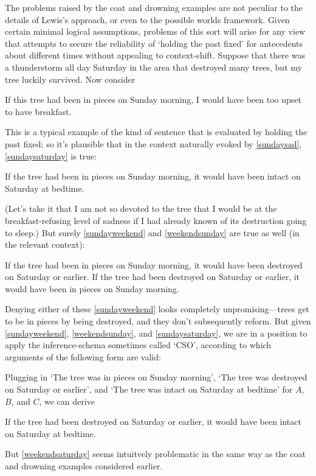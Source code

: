 \documentclass[If.tex]{subfiles}
\begin{document}
The problems raised by the coat and drowning examples are not peculiar to the details of Lewis's approach, or even to the possible worlds framework. Given certain minimal logical assumptions, problems of this sort will arise for any view that attempts to secure the reliability of ‘holding the past fixed’ for antecedents about different times without appealing to context-shift. Suppose that there was a thunderstorm all day Saturday in the area that destroyed many trees, but my tree luckily survived. Now consider
\begin{prop}
	\nitem \label{sundaysad}
		If this tree had been in pieces on Sunday morning, I would have been too upset to have breakfast.
\end{prop}
This is a typical example of the kind of sentence that is evaluated by holding the past fixed; so it's plausible that in the context naturally evoked by \ref{sundaysad}, \ref{sundaysaturday} is true:
\begin{prop}
	\nitem \label{sundaysaturday}
		If the tree had been in pieces on Sunday morning, it would have been intact on Saturday at bedtime.
\end{prop}
(Let's take it that I am not so devoted to the tree that I would be at the breakfast-refusing level of sadness if I had already known of its destruction going to sleep.)  But surely \ref{sundayweekend} and \ref{weekendsunday} are true as well (in the relevant context):
\begin{prop}
	\nitem \label{sundayweekend}
		If the tree had been in pieces on Sunday morning, it would have been destroyed on Saturday or earlier.
	\nitem \label{weekendsunday}
		If the tree had been destroyed on Saturday or earlier, it would have been in pieces on Sunday morning.
\end{prop}
Denying either of these \ref{sundayweekend} looks completely unpromising---trees get to be in pieces by being destroyed, and they don't subsequently reform.  But given \ref{sundayweekend}, \ref{weekendsunday}, and \ref{sundaysaturday}, we are in a position to apply the inference-schema sometimes called ‘CSO’, according to which arguments of the following form are valid:
\begin{prop}
	\litem[CSO]
\end{prop}
Plugging in ‘The tree was in pieces on Sunday morning’, ‘The tree was destroyed on Saturday or earlier’, and ‘The tree was intact on Saturday at bedtime’ for $A$, $B$, and $C$, we can derive
\begin{prop}
	\nitem \label{weekendsaturday}
		If the tree had been destroyed on Saturday or earlier, it would have been intact on Saturday at bedtime.
\end{prop}
But \ref{weekendsaturday} seems intuitvely problematic in the same way as the coat and drowning examples considered earlier.
\end{document}
